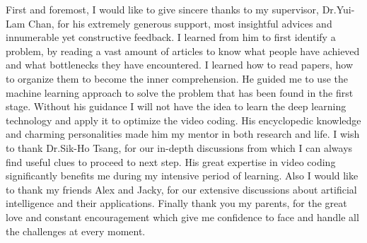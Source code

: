 \documentclass{report}
\begin{document}
    First and foremost, I would like to give sincere thanks to my supervisor,
    Dr.Yui-Lam Chan, for his
    extremely generous support, most insightful advices and innumerable yet
    constructive feedback.
    I learned from him to first identify a problem,
    by reading a vast amount of articles
    to know what people have achieved and what bottlenecks they have encountered.
    I learned how to read papers, how to organize them to
    become the inner comprehension.
    He guided me to use the machine learning approach to solve the
    problem that has been found in the first stage.
    Without his guidance I will not have the idea to learn the deep
    learning technology and apply it to optimize the video coding.
    His encyclopedic knowledge and charming personalities made him my mentor in
    both research and life.
    I wish to thank Dr.Sik-Ho Tsang, for our in-depth discussions from
    which I can always find useful clues to proceed to next step.
    His great expertise in video coding significantly benefits me during my
    intensive period of learning.
    Also I would like to thank my friends Alex
    and Jacky, for our
    extensive discussions about artificial intelligence
    and their applications.
    Finally thank you my parents, for the great love and constant
    encouragement which give me confidence to face and handle all the
    challenges at every moment.
    \afterpreface

    
    
    
    
    
    
    
    \printbibliography[heading=bibintoc]
\end{document}
